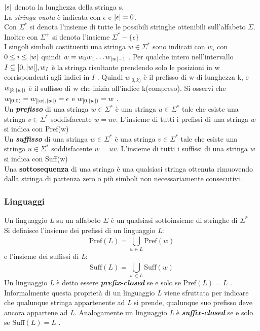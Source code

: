 $\lvert s\rvert$ denota la lunghezza  della stringa s.\\
La \textit{stringa vuota} è indicata con $\epsilon$ e $\lvert\epsilon\rvert = 0$. \\
Con $\Sigma^{*}$ si denota l'insieme di tutte le possibili stringhe ottenibili sull'alfabeto $\Sigma$. Inoltre con $\Sigma^{+}$ si denota l'insieme $\Sigma^{*} - \{\epsilon\}$ \\
I singoli simboli costituenti una stringa $w \in \Sigma^{*}$ sono indicati con $w_i$ con $0 \leq i \le \lvert w\rvert$ quindi $w = w_0 w_1 \dots w_{\lvert w\rvert-1}$ . Per qualche intero nell'intervallo $I \subseteq [0,\lvert w\rvert], w_I$ è la stringa risultante prendendo solo le posizioni in w corrispondenti agli indici in $I$ . Quindi $w_{[0,k)}$ è il prefisso di w di lunghezza k, e $w_{[k,\lvert w\rvert)}$ è il suffisso di w che inizia all'indice k(compreso). Si osservi che $w_{[0,0)} = w_{[\lvert w\rvert,\lvert w\rvert)} = \epsilon$ e $w_{[0,\lvert w\rvert)} = w$ .\\
Un \textbf{\textit{prefisso}}  di una stringa $w \in \Sigma^{*}$ è una stringa $u \in \Sigma^{*}$ tale che esiste una stringa $v \in \Sigma^{*}$ soddisfacente $w=uv$. L'insieme di tutti i prefissi di una stringa $w$ si indica con Pref(w)\\
Un \textbf{\textit{suffisso}}  di una stringa $w \in \Sigma^{*}$ è una stringa $v \in \Sigma^{*}$ tale che esiste una stringa $u \in \Sigma^{*}$ soddisfacente $w=uv$. L'insieme di tutti i suffissi di una stringa $w$ si indica con Suff(w)\\
Una \textbf{sottosequenza} di una stringa è una qualsiasi stringa ottenuta rimuovendo dalla stringa di partenza zero o più simboli non necessariamente consecutivi.
\subsubsection{Linguaggi}
Un linguaggio \textit{L} su un alfabeto $\Sigma$ è un qualsiasi sottoinsieme di stringhe di $\Sigma^{*}$\\ 
Si definisce l'insieme dei prefissi di un linguaggio \textit{L}:
\begin{equation*}
 \text{Pref}(L) = \bigcup_{w \in L}^{}{\text{Pref}(w)}
 \end{equation*}
e l'insieme dei suffissi di \textit{L}:
\begin{equation*}
 \text{Suff}(L) = \bigcup_{w \in L}^{}{\text{Suff}(w)}
 \end{equation*}
 Un linguaggio \textit{L} è detto essere \textbf{\textit{prefix-closed}} se e solo se $\text{Pref}(L) = L$ . Informalmente questa proprietà di un linguaggio \textit{L} viene sfruttata per indicare che qualunque stringa appartenente ad \textit{L} si prende, qualunque suo prefisso deve ancora appartene ad \textit{L}. Analogamente un linguaggio \textit{L} è \textbf{\textit{suffix-closed}} se e solo se $\text{Suff}(L) = L$ . \\
 
